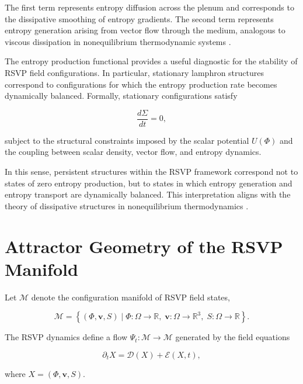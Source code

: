 \documentclass[12pt]{article}
\begin{document}
The first term represents entropy diffusion across the plenum and corresponds to the dissipative smoothing of entropy gradients. The second term represents entropy generation arising from vector flow through the medium, analogous to viscous dissipation in nonequilibrium thermodynamic systems \cite{prigogine1984,nicolis1977}.

The entropy production functional provides a useful diagnostic for the stability of RSVP field configurations. In particular, stationary lamphron structures correspond to configurations for which the entropy production rate becomes dynamically balanced. Formally, stationary configurations satisfy

\begin{equation}
\frac{d\Sigma}{dt} = 0 ,
\label{eq:entropy_stationary}
\end{equation}

subject to the structural constraints imposed by the scalar potential $U(\Phi)$ and the coupling between scalar density, vector flow, and entropy dynamics.

In this sense, persistent structures within the RSVP framework correspond not to states of zero entropy production, but to states in which entropy generation and entropy transport are dynamically balanced. This interpretation aligns with the theory of dissipative structures in nonequilibrium thermodynamics \cite{prigogine1984}.

\section{Attractor Geometry of the RSVP Manifold}
\label{sec:attractor_geometry}

Let $\mathcal{M}$ denote the configuration manifold of RSVP field states,

\begin{equation}
\mathcal{M} =
\left\{
(\Phi,\mathbf{v},S)
\mid
\Phi : \Omega \to \mathbb{R},\;
\mathbf{v} : \Omega \to \mathbb{R}^3,\;
S : \Omega \to \mathbb{R}
\right\}.
\end{equation}

The RSVP dynamics define a flow $\Psi_t : \mathcal{M} \rightarrow \mathcal{M}$ generated by the field equations

\begin{equation}
\partial_t X = \mathcal{D}(X) + \mathcal{E}(X,t),
\end{equation}

where $X = (\Phi,\mathbf{v},S)$.
\end{document}
